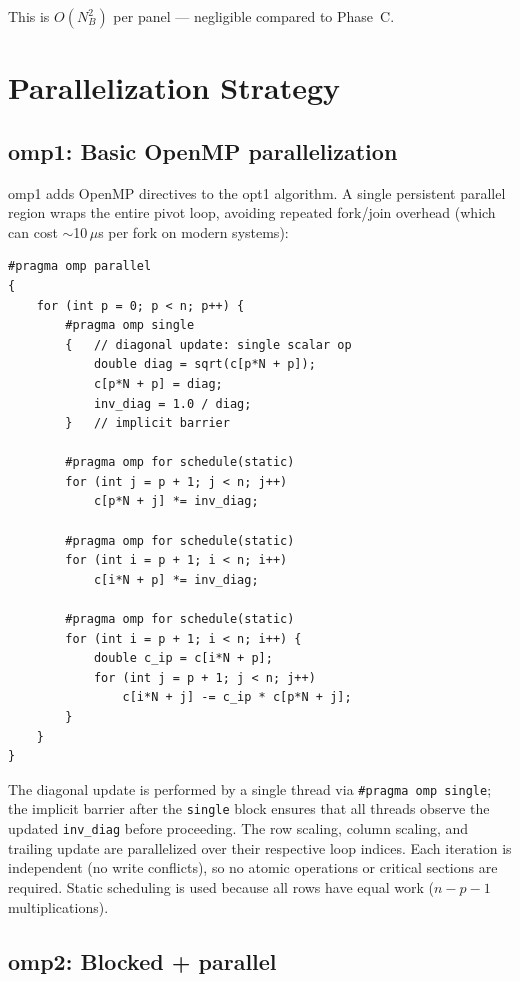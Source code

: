 \documentclass[10pt,leqno]{amsart}
\begin{document}
This is $O(N_B^2)$ per panel --- negligible compared to Phase~C.

\section{Parallelization Strategy}

\subsection{omp1: Basic OpenMP parallelization}

omp1 adds OpenMP directives to the opt1 algorithm. A single persistent 
parallel region wraps the entire pivot loop, avoiding repeated fork/join 
overhead (which can cost $\sim$10\,$\mu$s per fork on modern systems):

\begin{lstlisting}
#pragma omp parallel
{
    for (int p = 0; p < n; p++) {
        #pragma omp single
        {   // diagonal update: single scalar op
            double diag = sqrt(c[p*N + p]);
            c[p*N + p] = diag;
            inv_diag = 1.0 / diag;
        }   // implicit barrier

        #pragma omp for schedule(static)
        for (int j = p + 1; j < n; j++)
            c[p*N + j] *= inv_diag;

        #pragma omp for schedule(static)
        for (int i = p + 1; i < n; i++)
            c[i*N + p] *= inv_diag;

        #pragma omp for schedule(static)
        for (int i = p + 1; i < n; i++) {
            double c_ip = c[i*N + p];
            for (int j = p + 1; j < n; j++)
                c[i*N + j] -= c_ip * c[p*N + j];
        }
    }
}
\end{lstlisting}

The diagonal update is performed by a single thread via 
\texttt{\#pragma omp single}; the implicit barrier after the 
\texttt{single} block ensures that all threads observe the updated 
\texttt{inv\_diag} before proceeding. The row scaling, column scaling, and 
trailing update are parallelized over their respective loop indices. Each 
iteration is independent (no write conflicts), so no atomic operations or 
critical sections are required. Static scheduling is used because all rows 
have equal work ($n-p-1$ multiplications).

\subsection{omp2: Blocked + parallel}
\end{document}
